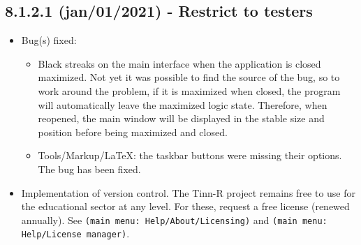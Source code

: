 \subsection*{8.1.2.1 (jan/01/2021) - Restrict to testers}
\begin{itemize}
  \item Bug(s) fixed:
    \begin{itemize}
      \item Black streaks on the main interface when the application is closed maximized. Not yet
        it was possible to find the source of the bug, so to work around the problem, if it is maximized
        when closed, the program will automatically leave the maximized logic state. Therefore,
        when reopened, the main window will be displayed in the stable size and position before being maximized and closed.
       \item Tools/Markup/LaTeX: the taskbar buttons were missing their options. The bug has been fixed.
    \end{itemize}
  \item Implementation of version control.
    The Tinn-R project remains free to use for the educational sector
    at any level. For these, request a free license (renewed annually).
    See \texttt{(main menu: Help/About/Licensing)} and \texttt{(main menu: Help/License manager)}.
\end{itemize}
